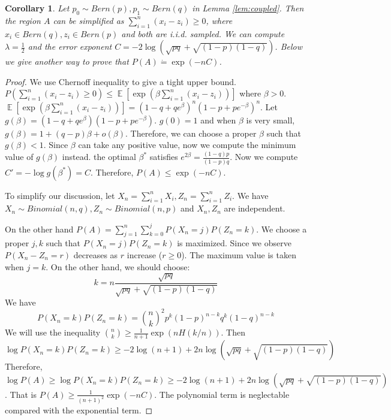 \documentclass{article}
\newtheorem{corollary}{Corollary}
\DeclareMathOperator{\E}{\mathbb{E}}
\begin{document}
\begin{corollary}\label{cor:xz}
	Let $p_0 \sim Bern(p), p_1 \sim Bern(q)$ in Lemma \ref{lem:coupled}. Then the region $A$ can be simplified as $\sum_{i=1}^n (x_i - z_i) \geq 0$,
	where $x_i \in Bern(q), z_i \in Bern(p)$ and both are i.i.d. sampled. We can compute $\lambda = \frac{1}{2}$ and the error exponent
	$C = -2\log(\sqrt{pq} + \sqrt{(1-p)(1-q)})$. Below we give another way to prove that $P(A) \dot{=} \exp(-nC)$.
\end{corollary}
\begin{proof}
	We use Chernoff inequality to give a tight upper bound.
	$P(\sum_{i=1}^n (x_i - z_i) \geq 0) \leq \E[\exp(\beta \sum_{i=1}^n (x_i - z_i))]$ where $\beta > 0$.
	$\E[\exp(\beta \sum_{i=1}^n (x_i - z_i))] = (1-q+q e^{\beta})^n(1-p+p e^{-\beta})^n$. Let
	$g(\beta)  = (1-q+q e^{\beta})(1-p+p e^{-\beta})$. $g(0) = 1$ and when $\beta$ is very small,
	$g(\beta) = 1 + (q-p) \beta + o(\beta)$. Therefore, we can choose a proper $\beta$ such that $g(\beta) < 1$.
	Since $\beta$ can take any positive value, now we compute the minimum value of $g(\beta)$ instead.
	the optimal $\beta^*$ satisfies $e^{2\beta} = \frac{(1-q)p}{(1-p)q}$. Now we compute $C' = -\log g(\beta^*) = C$.
	Therefore, $P(A) \leq \exp(-nC)$.
	
	To simplify our discussion, let $X_n = \sum_{i=1}^n X_i, Z_n = \sum_{i=1}^n Z_i$. We have $X_n \sim Binomial(n, q),
	Z_n \sim Binomial(n, p)$ and $X_n, Z_n$ are independent.
	
	On the other hand $P(A) = \sum_{j=1}^n\sum_{k=0}^j P(X_n = j)P(Z_n = k)$.
	We choose a proper $j,k$ such that $P(X_n = j)P(Z_n = k)$ is maximized.
	Since we observe $P(X_n - Z_n = r)$ decreases as $r$ increase ($r\geq 0$).
	The maximum value is taken when $j=k$. On the other hand,
	we should choose:
	$$
	k = n \frac{\sqrt{pq}}{\sqrt{pq} + \sqrt{(1-p)(1-q)}}
	$$
	We have
$$
		P(X_n = k)P(Z_n = k) = \binom{n}{k}^2 p^k (1-p)^{n-k}q^k(1-q)^{n-k}
$$
We will use the inequality $\binom{n}{k} \geq \frac{1}{n+1}\exp(nH(k/n))$.
Then
$$
\log P(X_n = k)P(Z_n = k) \geq -2\log(n+1) + 2n \log(\sqrt{pq} + \sqrt{(1-p)(1-q)})
$$
Therefore, $\log P(A) \geq \log P(X_n = k)P(Z_n = k) \geq -2\log(n+1) + 2n \log(\sqrt{pq} + \sqrt{(1-p)(1-q)})$.
That is $P(A) \geq \frac{1}{(n+1)^2}\exp(-nC)$.
The polynomial term is neglectable compared with the exponential term.
\end{proof}
\end{document}
